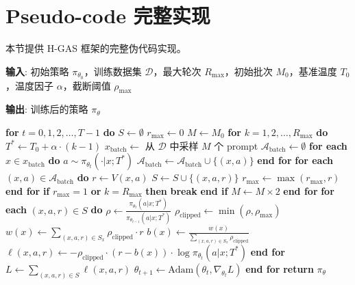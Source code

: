 \section{Pseudo-code 完整实现}
\label{sec:appendix_pseudocode}

本节提供 H-GAS 框架的完整伪代码实现。

\begin{algorithm}[htbp]
\caption{H-GAS: 层级几何自适应采样框架}
\label{alg:hgas_full}
\textbf{输入}: 初始策略 $\pi_{\theta_0}$，训练数据集 $\mathcal{D}$，最大轮次 $R_{\max}$，初始批次 $M_0$，基准温度 $T_0$，温度因子 $\alpha$，截断阈值 $\rho_{\max}$

\textbf{输出}: 训练后的策略 $\pi_\theta$

\begin{algorithmic}[1]
\State \textbf{for} $t = 0, 1, 2, \ldots, T-1$ \textbf{do}
\State \quad $S \leftarrow \emptyset$ 
\State \quad $r_{\max} \leftarrow 0$ 
\State \quad $M \leftarrow M_0$ 
\State \quad \textbf{for} $k = 1, 2, \ldots, R_{\max}$ \textbf{do}
\State \quad\quad $T^* \leftarrow T_0 + \alpha \cdot (k-1)$ 
\State \quad\quad $x_{\text{batch}} \leftarrow$ 从 $\mathcal{D}$ 中采样 $M$ 个 prompt
\State \quad\quad $\mathcal{A}_{\text{batch}} \leftarrow \emptyset$
\State \quad\quad \textbf{for each} $x \in x_{\text{batch}}$ \textbf{do}
\State \quad\quad\quad $a \sim \pi_{\theta_t}(\cdot | x; T^*)$
\State \quad\quad\quad $\mathcal{A}_{\text{batch}} \leftarrow \mathcal{A}_{\text{batch}} \cup \{(x, a)\}$
\State \quad\quad \textbf{end for}
\State \quad\quad \textbf{for each} $(x, a) \in \mathcal{A}_{\text{batch}}$ \textbf{do}
\State \quad\quad\quad $r \leftarrow V(x, a)$ 
\State \quad\quad\quad $S \leftarrow S \cup \{(x, a, r)\}$
\State \quad\quad\quad $r_{\max} \leftarrow \max(r_{\max}, r)$
\State \quad\quad \textbf{end for}
\State \quad\quad {}
\State \quad\quad \textbf{if} $r_{\max} = 1$ \textbf{or} $k = R_{\max}$ \textbf{then}
\State \quad\quad\quad \textbf{break}
\State \quad\quad \textbf{end if}
\State \quad\quad $M \leftarrow M \times 2$ 
\State \quad \textbf{end for}
\State \quad {}
\State \quad \textbf{for each} $(x, a, r) \in S$ \textbf{do}
\State \quad\quad $\rho \leftarrow \frac{\pi_{\theta_t}(a|x; T^*)}{\pi_{\theta_{t-1}}(a|x; T^*)}$
\State \quad\quad $\rho_{\text{clipped}} \leftarrow \min(\rho, \rho_{\max})$
\State \quad\quad $w(x) \leftarrow \sum_{(x,a,r) \in S_x} \rho_{\text{clipped}} \cdot r$
\State \quad\quad $b(x) \leftarrow \frac{w(x)}{\sum_{(x,a,r) \in S_x} \rho_{\text{clipped}}}$
\State \quad\quad $\ell(x, a, r) \leftarrow -\rho_{\text{clipped}} \cdot (r - b(x)) \cdot \log \pi_{\theta_t}(a|x; T^*)$
\State \quad \textbf{end for}
\State \quad $L \leftarrow \sum_{(x,a,r) \in S} \ell(x, a, r)$
\State \quad $\theta_{t+1} \leftarrow \text{Adam}(\theta_t, \nabla_{\theta_t} L)$ 
\State \textbf{end for}
\State \textbf{return} $\pi_\theta$
\end{algorithmic}
\end{algorithm}


